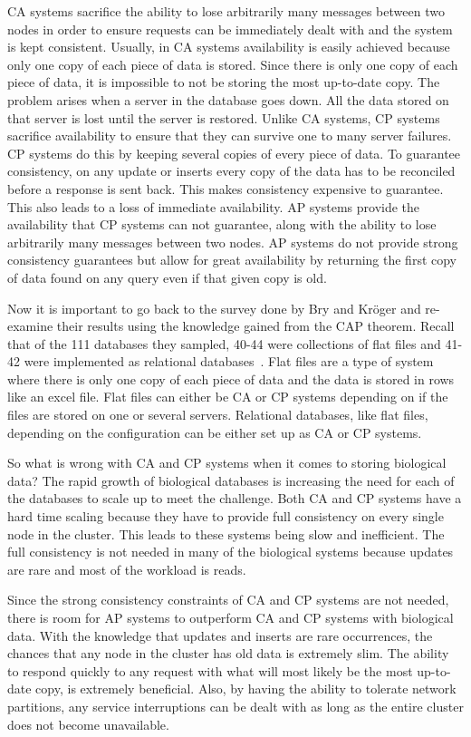 \documentclass[12pt]{ucthesis}
\begin{document}
CA systems sacrifice the ability to lose arbitrarily many messages between two nodes in order to ensure requests can be immediately dealt with and the system is kept consistent. Usually, in CA systems availability is easily achieved because only one copy of each piece of data is stored. Since there is only one
copy of each piece of data, it is impossible to not be storing the most up-to-date copy. 
The problem arises when a server
in the database goes down. All the data stored on that server is lost until the server is restored. Unlike CA systems, CP systems sacrifice availability to ensure that they can survive one to many server failures. CP systems do this by keeping several copies of every piece of data. To guarantee consistency, on any update or inserts every copy of the data has to be reconciled before a response is sent back. This makes consistency expensive to guarantee. This also leads to a loss of immediate availability. AP systems provide the availability that CP systems can not guarantee, along with the ability to lose arbitrarily many messages between two nodes. AP systems do not provide strong consistency guarantees but allow for great availability by returning the first copy of data found on any query even if that
given copy is old.

Now it is important to go back to the survey done by Bry and Kr\"{o}ger and re-examine their results
using the knowledge gained from the CAP theorem. Recall that of the 111 databases they sampled, 40-44 were collections of flat files and 41-42 were implemented as relational databases~\cite{bry_computational_2003}.
Flat files are a type of system where there is only one copy of each piece of data and the data is stored
in rows like an excel file. Flat files can either be CA or CP systems depending on if the files are stored
on one or several servers. Relational databases, like flat files, depending on the configuration can be
either set up as CA or CP systems. 

So what is wrong with CA and CP systems when it comes to storing biological data? The rapid growth of biological databases is increasing the need for each of the databases to scale up to meet the challenge. Both CA and CP systems have a hard time scaling because they have to provide full consistency on every single node in the cluster. This leads to these systems being slow and inefficient. The full consistency is not needed in many of the biological systems because updates are rare and most of the workload is reads.

Since the strong consistency constraints of CA and CP systems are not needed, there is room for AP
systems to outperform CA and CP systems with biological data. With the knowledge that updates and inserts are rare occurrences, the chances that any node in the cluster has old
data is extremely slim. The ability to respond quickly to any request with what will most likely be the most
up-to-date copy, is extremely beneficial. Also, by having the ability to tolerate network partitions, any
service interruptions can be dealt with as long as the entire cluster does not become unavailable.
\end{document}
